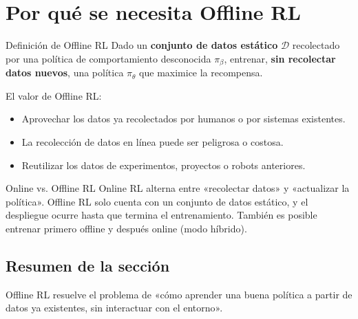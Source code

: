 \section{Por qué se necesita Offline RL}

\begin{importantbox}{Definición de Offline RL}
Dado un \textbf{conjunto de datos estático} $\mathcal{D}$ recolectado por una política de comportamiento desconocida $\pi_\beta$, entrenar, \textbf{sin recolectar datos nuevos}, una política $\pi_\theta$ que maximice la recompensa.
\end{importantbox}

El valor de Offline RL:
\begin{itemize}
    \item Aprovechar los datos ya recolectados por humanos o por sistemas existentes.
    \item La recolección de datos en línea puede ser peligrosa o costosa.
    \item Reutilizar los datos de experimentos, proyectos o robots anteriores.
\end{itemize}

\begin{knowledgebox}{Online vs. Offline RL}
Online RL alterna entre «recolectar datos» y «actualizar la política». Offline RL solo cuenta con un conjunto de datos estático, y el despliegue ocurre hasta que termina el entrenamiento. También es posible entrenar primero offline y después online (modo híbrido).
\end{knowledgebox}

\subsection{Resumen de la sección}

Offline RL resuelve el problema de «cómo aprender una buena política a partir de datos ya existentes, sin interactuar con el entorno».

